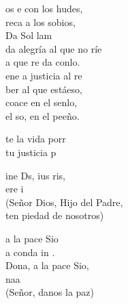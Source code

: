 \documentclass[12pt]{article}
\begin{document}
\begin{multicols*}{2}
\begin{cancion}%
	os e con los hudes, \\
	reca a los sobios,\\
Da     Sol           lam\\
da alegría al que no ríe\\
	a que re da conlo.\\
	ene a  justicia al re\\
	ber al que estáeso,\\
	 coace en el senlo,\\
	 el so, en el peeño.\\
\end{cancion}%

\begin{cancion}%
	te la vida porr\\
	tu justicia p\\
\end{cancion}%

\begin{cancion}%
	ine Ds, ius ris,\\
	ere i\\
(Señor Dios, Hijo del Padre,\\
 ten piedad de nosotros)\\
\end{cancion}%

\begin{cancion}%
	a la pace Sio\\
	a  conda in .\\
	Dona, a la pace Sio,\\
	naa\\
(Señor, danos la paz)\\
\end{cancion}%


\end{multicols*}
\end{document}

